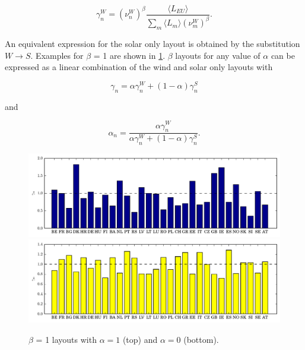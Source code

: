 \documentclass[a4paper, 12pt, sort&compress]{elsarticle}%
\newcommand{\paren}[1]{\left(#1\right)}
\newcommand{\chromowidth}{1.05 \columnwidth}
\begin{document}
\begin{equation}
  \label{eq:8}
  \gamma_{n}^{W} = \paren{\nu^{W}_{n}}^{\beta} \frac{\langle L_{EU}
    \rangle}{\sum_{m} \langle L_{m}
    \rangle \paren{\nu^{W}_{m}}^{\beta}}.
\end{equation}

An equivalent expression for the solar only layout is obtained by the
substitution $W \to S$. Examples for $\beta$ = 1 are shown in
\cref{fig:beta1}. $\beta$ layouts for any value of $\alpha$ can be expressed as
a linear combination of the wind and solar only layouts with


\begin{equation}
  \label{eq:9}
  \gamma_{n} = \alpha \gamma^{W}_{n} + (1-\alpha) \gamma^{S}_{n} 
\end{equation}

and

\begin{equation}
  \label{eq:9}
  \alpha_{n} = \frac{\alpha \gamma_{n}^{W}}{\alpha \gamma_{n}^{W} + (1-\alpha) \gamma_{n}^{S}} .
\end{equation}


\begin{figure}[h!]
  \centering
  \includegraphics[width = \chromowidth, center]{beta=1wind}
  \includegraphics[width = \chromowidth, center]{beta=1solar}
  \caption{$\beta$ = 1 layouts with $\alpha = 1$ (top) and $\alpha = 0$ (bottom).}
  \label{fig:beta1}
\end{figure}
\end{document}
